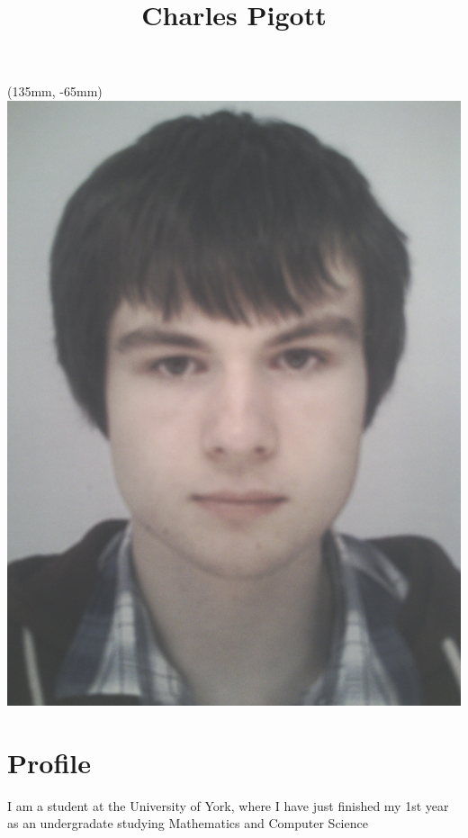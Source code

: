 \documentclass[11pt,a4paper]{article}
\title{Charles Pigott}
\author{}
\date{
  \href{mailto:\email}{\email}\\
  07821 169 013 (Mobile)\\
  \address
}
\begin{document}
\maketitle
\ifuni
  \begin{textblock*}{40mm}(135mm, -65mm)
  \includegraphics[scale=0.045]{FaceOct13}
  \end{textblock*}
\fi
\thispagestyle{fancy}

\section*{Profile}
I am a student at the University of York, where I have just finished my 1st
year as an undergradate studying Mathematics and Computer Science
\end{document}
